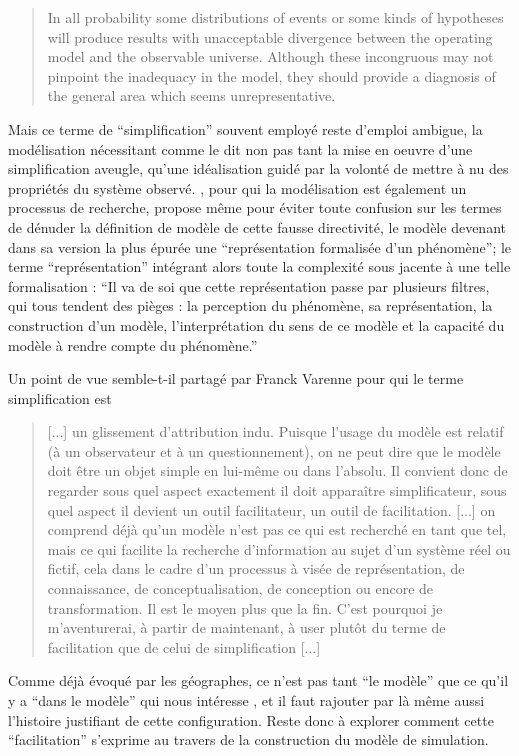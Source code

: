 \foreignblockquote{english}[{\cite[226]{Hermann1967}}]{In all probability some distributions of events or some kinds of hypotheses will produce results with unacceptable divergence between the operating model and the observable universe. Although these incongruous may not pinpoint the inadequacy in the model, they should provide a diagnosis of the general area which seems unrepresentative.} 

Mais ce terme de \enquote{simplification} souvent employé reste d'emploi ambigue, la modélisation nécessitant comme le dit \textcite{Haggett1965} non pas tant la mise en oeuvre d'une simplification aveugle, qu'une idéalisation guidé par la volonté de mettre à nu des propriétés du système observé. \textcite{Brunet2000}, pour qui la modélisation est également un processus de recherche, propose même pour éviter toute confusion sur les termes de dénuder la définition de modèle de cette fausse directivité, le modèle devenant dans sa version la plus épurée une \enquote{représentation formalisée d'un phénomène}; le terme \enquote{représentation} intégrant alors toute la complexité sous jacente à une telle formalisation : \enquote{Il va de soi que cette représentation passe par plusieurs filtres, qui tous tendent des pièges : la perception du phénomène, sa représentation, la construction d'un modèle, l'interprétation du sens de ce modèle et la capacité du modèle à rendre compte du phénomène.}

Un point de vue semble-t-il partagé par Franck Varenne pour qui le terme simplification est \blockquote[{\cite{Varenne2008}}]{[...] un glissement d’attribution indu. Puisque l’usage du modèle est relatif (à un observateur et à un questionnement), on ne peut dire que le modèle doit être un objet simple en lui-même ou dans l’absolu. Il convient donc de regarder sous quel aspect exactement il doit apparaître simplificateur, sous quel aspect il devient un outil facilitateur, un outil de facilitation. [...] on comprend déjà qu’un modèle n’est pas ce qui est recherché en tant que tel, mais ce qui facilite la recherche d’information au sujet d’un système réel ou fictif, cela dans le cadre d’un processus à visée de représentation, de connaissance, de conceptualisation, de conception ou encore de transformation. Il est le moyen plus que la fin. C’est pourquoi je m’aventurerai, à partir de maintenant, à user plutôt du terme de facilitation que de celui de simplification [...]}

Comme déjà évoqué par les géographes, ce n'est pas tant \enquote{le modèle} que ce qu'il y a \enquote{dans le modèle} qui nous intéresse \autocites{Sanders2000, Besse2000}, et il faut rajouter par là même aussi l'histoire justifiant de cette configuration. Reste donc à explorer comment cette \enquote{facilitation} s'exprime au travers de la construction du modèle de simulation. 

